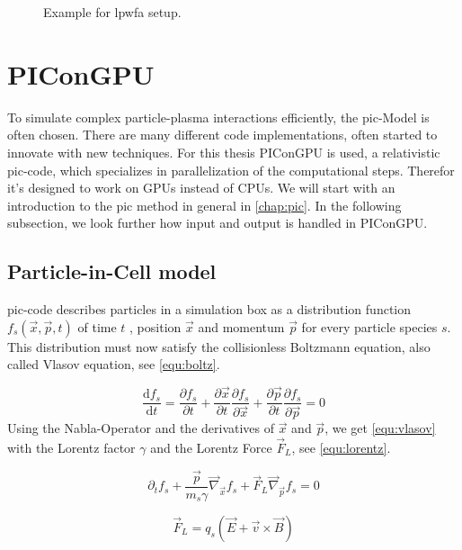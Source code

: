 \documentclass[bachelor_thesis]{subfiles}
\begin{document}
\begin{figure}
	\centering
	\missingfigure{}
	\caption{Example for \gls{lpwfa} setup.}
	\label{fig:lpwfa} 
\end{figure}

\section{PIConGPU}
To simulate complex particle-plasma interactions efficiently, the \gls{pic}-Model is often chosen. There are many different code implementations, often started to innovate with new techniques. For this thesis PIConGPU \cite{PIConGPU2013, PICRepo} is used, 
a relativistic \gls{pic}-code, which specializes in parallelization of the computational steps. Therefor it's designed to work on GPUs instead of CPUs. We will start with an introduction to the \gls{pic} method in general in \autoref{chap:pic}.
In the following subsection, we look further how input and output is handled in PIConGPU.

\subsection{Particle-in-Cell model} \label{chap:pic}
\Gls{pic}-code describes particles in a simulation box as a distribution function $f_s(\vec{x}, \vec{p}, t)$ of time $t$ , position $\vec{x}$ and momentum $\vec{p}$ for every particle species $s$.
This distribution must now satisfy the collisionless Boltzmann equation, also called Vlasov equation\cite{Vlasov1968}, see \autoref{equ:boltz}.

\begin{equation}
	\frac{\mathrm{d}f_s}{\mathrm{d}t}=\frac{\partial f_s}{\partial t} + \frac{\partial \vec{x}}{\partial t} \frac{\partial f_s}{\partial \vec{x}} + \frac{\partial \vec{p}}{\partial t} \frac{\partial f_s}{\partial \vec{p}} = 0
	\label{equ:boltz}
\end{equation}
Using the Nabla-Operator and the derivatives of $\vec{x}$ and $\vec{p}$, we get \autoref{equ:vlasov} with the Lorentz factor $\gamma$ and the Lorentz Force $\vec{F}_L$, see \autoref{equ:lorentz}.

\begin{equation}
	\partial_t f_s + \frac{\vec{p}}{m_s \gamma} \vec{\nabla}_{\vec{x}} f_s + \vec{F}_L \vec{\nabla}_{\vec{p}} f_s = 0
	\label{equ:vlasov}
\end{equation}

\begin{equation}
	\vec{F}_L=q_s\left(\vec{E}+\vec{v}\times\vec{B}\right)
	\label{equ:lorentz}
\end{equation}
\end{document}
